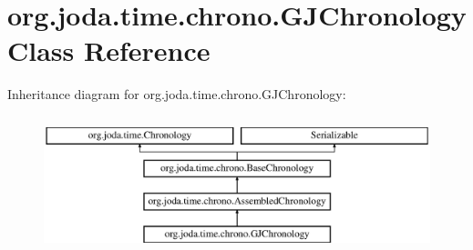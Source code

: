 \hypertarget{classorg_1_1joda_1_1time_1_1chrono_1_1_g_j_chronology}{\section{org.\-joda.\-time.\-chrono.\-G\-J\-Chronology Class Reference}
\label{classorg_1_1joda_1_1time_1_1chrono_1_1_g_j_chronology}
}
Inheritance diagram for org.\-joda.\-time.\-chrono.\-G\-J\-Chronology\-:\begin{figure}[H]
\begin{center}
\leavevmode
\includegraphics[height=4.000000cm]{classorg_1_1joda_1_1time_1_1chrono_1_1_g_j_chronology}
\end{center}
\end{figure}
